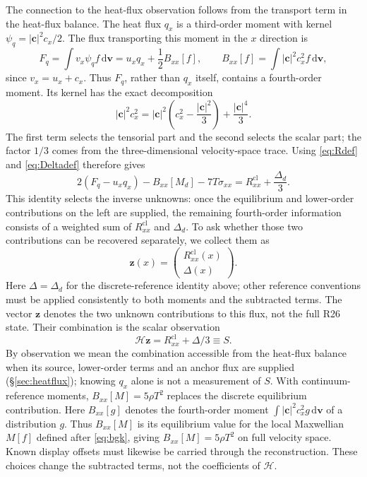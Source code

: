 \documentclass[lineno,paper]{JFM-FLM_Au}
\newenvironment{revision}{\begingroup\colorlet{shadecolor}{revisionyellow}\begin{shaded}}{\end{shaded}\endgroup}
\newenvironment{revision}{}{}
\newcommand{\dd}{\mathrm{d}}
\newcommand{\cl}{\mathrm{cl}}
\begin{document}
\begin{revision}
The connection to the heat-flux observation follows from the transport term in the heat-flux balance. The heat flux $q_x$ is a third-order moment with kernel $\psi_q=|\boldsymbol c|^2c_x/2$. The flux transporting this moment in the $x$ direction is
\[
 F_q=\int v_x\psi_q f\,\dd\boldsymbol v
     =u_xq_x+\frac12 B_{xx}[f],
 \qquad B_{xx}[f]=\int |\boldsymbol c|^2c_x^2f\,\dd\boldsymbol v,
\]
since $v_x=u_x+c_x$. Thus $F_q$, rather than $q_x$ itself, contains a fourth-order moment. Its kernel has the exact decomposition
\[
 |\boldsymbol c|^2c_x^2
 =|\boldsymbol c|^2\left(c_x^2-\frac{|\boldsymbol c|^2}{3}\right)
   +\frac{|\boldsymbol c|^4}{3} .
\]
The first term selects the tensorial part and the second selects the scalar part; the factor $1/3$ comes from the three-dimensional velocity-space trace. Using \eqref{eq:Rdef} and \eqref{eq:Deltadef} therefore gives
\[
 2(F_q-u_xq_x)-B_{xx}[M_d]-7T\sigma_{xx}
 =R^{\cl}_{xx}+\frac{\Delta_d}{3} .
\]
This identity selects the inverse unknowns: once the equilibrium and lower-order contributions on the left are supplied, the remaining fourth-order information consists of a weighted sum of $R^{\cl}_{xx}$ and $\Delta_d$. To ask whether those two contributions can be recovered separately, we collect them as
\begin{equation}
  \boldsymbol z(x)=\begin{pmatrix}R^{\cl}_{xx}(x)\\ \Delta(x)\end{pmatrix} .
  \label{eq:z_state}
\end{equation}
Here $\Delta=\Delta_d$ for the discrete-reference identity above; other reference conventions must be applied consistently to both moments and the subtracted terms. The vector $\boldsymbol z$ denotes the two unknown contributions to this flux, not the full R26 state. Their combination is the scalar observation
\begin{equation}
  \mathcal H\boldsymbol z = R^{\cl}_{xx}+\Delta/3 \equiv S .
  \label{eq:obs_operator}
\end{equation}
By observation we mean the combination accessible from the heat-flux balance when its source, lower-order terms and an anchor flux are supplied (\S\ref{sec:heatflux}); knowing $q_x$ alone is not a measurement of $S$. With continuum-reference moments, $B_{xx}[M]=5\rho T^2$ replaces the discrete equilibrium contribution. Here $B_{xx}[g]$ denotes the fourth-order moment
$\int |\boldsymbol c|^2c_x^2g\,\mathrm d\boldsymbol v$
of a distribution $g$. Thus $B_{xx}[M]$ is its equilibrium
value for the local Maxwellian $M[f]$ defined after
\eqref{eq:bgk}, giving $B_{xx}[M]=5\rho T^2$
on full velocity space. Known display offsets must likewise be carried through the reconstruction. These choices change the subtracted terms, not the coefficients of $\mathcal H$.
\end{revision}
\end{document}
